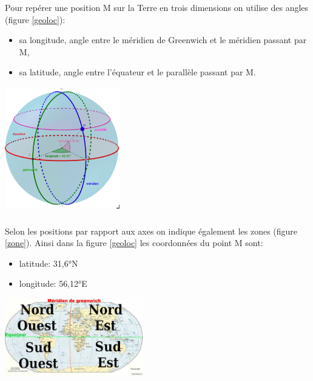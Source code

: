 \documentclass[svgnames,11pt]{beamer}
\begin{document}
\begin{frame}
    \frametitle{}
    Pour repérer une position M sur la Terre en trois dimensions on utilise des angles (figure \ref{geoloc}):
    \begin{itemize}
        \item sa longitude, angle entre le méridien de Greenwich et le méridien passant par M,
        \item sa latitude, angle entre l’équateur et le parallèle passant par M.
    \end{itemize}
    \begin{center}
        \centering
        \includegraphics[width=5cm]{ressources/geoloc.png}
        \label{geoloc}
    \end{center}


\end{frame}
\begin{frame}
    \frametitle{}

    Selon les positions par rapport aux axes on indique également les zones (figure \ref{zone}). Ainsi dans la figure \ref{geoloc} les coordonnées du point M sont:
    \begin{itemize}
        \item latitude: 31,6°N
        \item longitude: 56,12°E
    \end{itemize}
    \begin{center}
        \centering
        \includegraphics[width=6cm]{ressources/zone.png}
        \label{zone}
    \end{center}

\end{frame}
\end{document}
